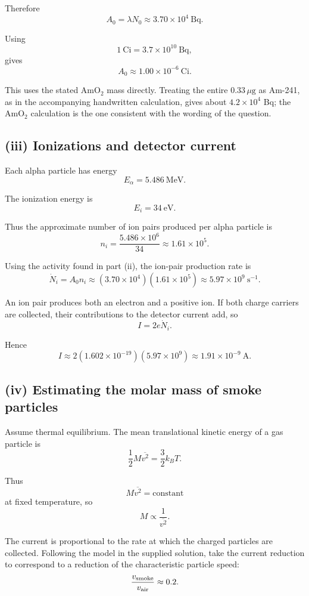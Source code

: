 \documentclass[11pt,a4paper]{article}
\begin{document}
Therefore
\[
A_0=\lambda N_0
\approx
\boxed{3.70\times10^4\ \mathrm{Bq}}.
\]

Using
\[
1\ \mathrm{Ci}=3.7\times10^{10}\ \mathrm{Bq},
\]
gives
\[
\boxed{A_0\approx1.00\times10^{-6}\ \mathrm{Ci}}.
\]

This uses the stated AmO$_2$ mass directly. Treating the entire
$0.33\,\mu\mathrm g$ as Am-241, as in the accompanying handwritten
calculation, gives about $4.2\times10^4$ Bq; the AmO$_2$ calculation is the
one consistent with the wording of the question.

\subsection{(iii) Ionizations and detector current}

Each alpha particle has energy
\[
E_\alpha=5.486\ \mathrm{MeV}.
\]

The ionization energy is
\[
E_i=34\ \mathrm{eV}.
\]

Thus the approximate number of ion pairs produced per alpha particle is
\[
n_i
=
\frac{5.486\times10^6}{34}
\approx
1.61\times10^5.
\]

Using the activity found in part (ii), the ion-pair production rate is
\[
\dot N_i=A_0n_i
\approx
(3.70\times10^4)(1.61\times10^5)
\approx
\boxed{5.97\times10^9\ \mathrm{s^{-1}}}.
\]

An ion pair produces both an electron and a positive ion. If both charge
carriers are collected, their contributions to the detector current add, so
\[
I=2e\dot N_i.
\]

Hence
\[
I
\approx
2(1.602\times10^{-19})(5.97\times10^9)
\approx
\boxed{1.91\times10^{-9}\ \mathrm A}.
\]

\subsection{(iv) Estimating the molar mass of smoke particles}

Assume thermal equilibrium. The mean translational kinetic energy of a gas
particle is
\[
\frac12M\overline{v^2}
=
\frac32k_BT.
\]

Thus
\[
M\overline{v^2}=\text{constant}
\]
at fixed temperature, so
\[
M\propto\frac1{\overline{v^2}}.
\]

The current is proportional to the rate at which the charged particles are
collected. Following the model in the supplied solution, take the current
reduction to correspond to a reduction of the characteristic particle speed:
\[
\frac{v_{\rm smoke}}{v_{\rm air}}\approx0.2.
\]
\end{document}
